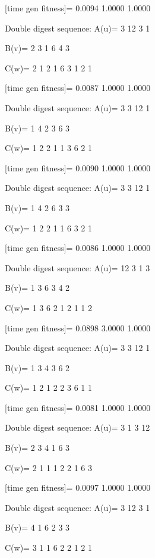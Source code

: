 [time gen fitness]=
    0.0094    1.0000    1.0000

Double digest sequence:
A(u)=
     3    12     3     1

B(v)=
     2     3     1     6     4     3

C(w)=
     2     1     2     1     6     3     1     2     1

[time gen fitness]=
    0.0087    1.0000    1.0000

Double digest sequence:
A(u)=
     3     3    12     1

B(v)=
     1     4     2     3     6     3

C(w)=
     1     2     2     1     1     3     6     2     1

[time gen fitness]=
    0.0090    1.0000    1.0000

Double digest sequence:
A(u)=
     3     3    12     1

B(v)=
     1     4     2     6     3     3

C(w)=
     1     2     2     1     1     6     3     2     1

[time gen fitness]=
    0.0086    1.0000    1.0000

Double digest sequence:
A(u)=
    12     3     1     3

B(v)=
     1     3     6     3     4     2

C(w)=
     1     3     6     2     1     2     1     1     2

[time gen fitness]=
    0.0898    3.0000    1.0000

Double digest sequence:
A(u)=
     3     3    12     1

B(v)=
     1     3     4     3     6     2

C(w)=
     1     2     1     2     2     3     6     1     1

[time gen fitness]=
    0.0081    1.0000    1.0000

Double digest sequence:
A(u)=
     3     1     3    12

B(v)=
     2     3     4     1     6     3

C(w)=
     2     1     1     1     2     2     1     6     3

[time gen fitness]=
    0.0097    1.0000    1.0000

Double digest sequence:
A(u)=
     3    12     3     1

B(v)=
     4     1     6     2     3     3

C(w)=
     3     1     1     6     2     2     1     2     1

